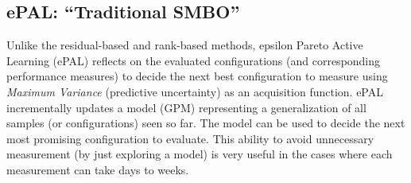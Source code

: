 \documentclass[10pt,journal,compsoc]{IEEEtran}
\begin{document}
\subsection{ePAL: ``Traditional SMBO''}\label{sec:epal}

Unlike the residual-based and rank-based methods, epsilon Pareto Active Learning (ePAL) reflects on the evaluated configurations (and corresponding performance measures) to decide the next best configuration to measure using \textit{Maximum Variance} (predictive uncertainty) as an acquisition function.   ePAL incrementally updates a  model (GPM) representing a generalization
of all samples (or configurations) seen so far. 
The model can be used to decide the next most promising configuration to evaluate.  This ability to avoid unnecessary measurement (by just exploring a model)
is very useful in the cases where each measurement can take days to weeks. 
\end{document}
